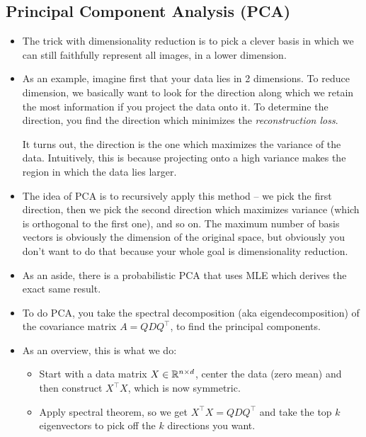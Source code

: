 \subsection{Principal Component Analysis (PCA)}
\begin{itemize}
	\item The trick with dimensionality reduction is to pick a clever basis in which
		we can still faithfully represent all images, in a lower dimension. 
	\item As an example, imagine first that your data lies in 2 dimensions. To reduce
		dimension, we basically want to look for the direction along which we retain
		the most information if you project the data onto it. To determine the
		direction, you find the direction which minimizes the \textit{reconstruction
		loss}.

		It turns out, the direction is the one which maximizes the variance of the
		data. Intuitively, this is because projecting onto a high variance makes the
		region in which the data lies larger. 
	\item The idea of PCA is to recursively apply this method -- we pick the first
		direction, then we pick the second direction which maximizes variance (which
		is orthogonal to the first one), and so on. The maximum number of basis
		vectors is obviously the dimension of the original space, but obviously you
		don't want to do that because your whole goal is dimensionality reduction.  
	\item As an aside, there is a probabilistic PCA that uses MLE which derives the
		exact same result. 
	\item To do PCA, you take the spectral decomposition (aka eigendecomposition) 
		of the covariance matrix \( A = QDQ^{\top} \), to find the principal
		components. 
	\item As an overview, this is what we do:
		\begin{itemize}
			\item Start with a data matrix \( X \in \mathbb R^{n \times d} \), center the
				data (zero mean) and then construct \( X^{\top} X \), 
				which is now symmetric. 
			\item Apply spectral theorem, so we get \( X^{\top} X = QDQ^{\top} \) and
				take the top \( k \) eigenvectors to pick off the \( k \) directions
				you want. 


\end{itemize}
\end{itemize}
